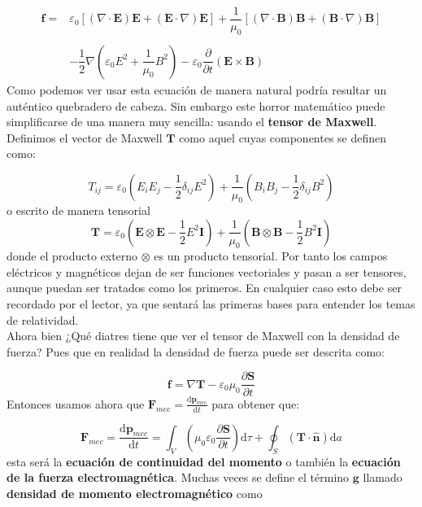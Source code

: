\documentclass[12pt,a4paper]{article}
\newcommand{\parentesis}[1]{\left( #1  \right)}
\newcommand{\parciales}[2]{\frac{\partial #1}{\partial #2}}
\newcommand{\ccorchetes}[1]{\left[ #1  \right]}
\newcommand{\D}{\mathrm{d}}
\newcommand{\dive}{\nabla \cdot}
\newcommand{\Bn}{\mathbf{B}}
\newcommand{\En}{\mathbf{E}}
\newcommand{\Fn}{\mathbf{F}}
\newcommand{\fn}{\mathbf{f}}
\newcommand{\pn}{\mathbf{p}}
\newcommand{\Sn}{\mathbf{S}}
\newcommand{\Tn}{\mathbf{T}}
\newcommand{\In}{\mathbf{I}}
\newcommand{\gn}{\mathbf{g}}
\newcommand{\hnn}{\hat{\mathbf{n}}}
\numberwithin{equation}{section}
\numberwithin{figure}{section}
\begin{document}
\begin{equation} \begin{array}{rl}
\fn =  & \varepsilon_{0} \ccorchetes{(\dive \En) \En + (\En \cdot \nabla) \En} + \dfrac{1}{\mu_0} \ccorchetes{(\dive \Bn)\Bn + (\Bn \cdot \nabla) \Bn}  \\ \\ & - \dfrac{1}{2} \nabla \parentesis{\varepsilon_0 E^2 + \dfrac{1}{\mu_0} B^2} - \varepsilon_0 \dfrac{\partial}{\partial t} (\En \times \Bn)
\end{array}
\end{equation}
Como podemos ver usar esta ecuación de manera natural podría resultar un auténtico quebradero de cabeza. Sin embargo este horror matemático puede simplificarse de una manera muy sencilla: usando el \textbf{tensor de Maxwell}. Definimos el vector de Maxwell $\Tn$ como aquel cuyas componentes se definen como:

\begin{equation}
T_{ij} = \varepsilon_0 \parentesis{E_i E_j - \dfrac{1}{2} \delta_{ij} E^2} + \dfrac{1}{\mu_0} \parentesis{B_i B_j - \dfrac{1}{2} \delta_{ij} B^2}
\end{equation}
o escrito de manera tensorial
\begin{equation}
\Tn = \varepsilon_0 \parentesis{\En \otimes \En - \dfrac{1}{2} E^2 \In} + \dfrac{1}{\mu_0}  \parentesis{\Bn \otimes \Bn - \dfrac{1}{2} B^2 \In}
\end{equation}
donde el producto externo $\otimes$ es un producto tensorial. Por tanto los campos eléctricos y magnéticos dejan de ser funciones vectoriales y pasan a ser tensores, aunque puedan ser tratados como los primeros. En cualquier caso esto debe ser recordado por el lector, ya que sentará las primeras bases para entender los temas de relatividad. \\ 

Ahora bien ¿Qué diatres tiene que ver el tensor de Maxwell con la densidad de fuerza? Pues que en realidad la densidad de fuerza puede ser descrita como: 

\begin{equation}
\fn = \nabla \Tn - \varepsilon_0 \mu_0 \parciales{\Sn}{t} 
\end{equation}
Entonces usamos ahora que $\Fn_{mec} = \frac{\D \pn_{mec}}{\D t}$ para obtener que:

\begin{equation}
\Fn_{mec} = \dfrac{\D \pn_{mec} }{\D t} = \int_V  \parentesis{ \mu_0 \varepsilon_0 \parciales{\Sn}{t}} \D \tau + \oint_S ( \Tn \cdot \hnn) \D a
\end{equation} 
esta será la \textbf{ecuación de continuidad del momento} o también la \textbf{ecuación de la fuerza electromagnética}. Muchas veces se define el término $\gn$ llamado \textbf{densidad de momento electromagnético} como 
\end{document}
